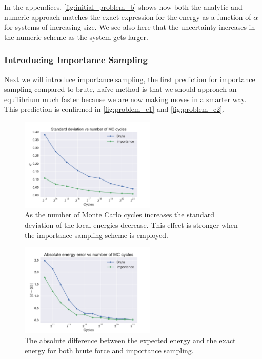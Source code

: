 \documentclass[
    a4paper, aps, twocolumn, floatfix, superscriptaddress,
    nofootinbib]{revtex4-1}
\newcommand{\1}{\mathds{1}}
\begin{document}
        In the appendices,  \autoref{fig:initial_problem_b} shows how both the
        analytic and numeric approach matches the exact expression for the
        energy as a function of $\alpha$ for systems of increasing size.  We see
        also here that the uncertainty increases in the numeric scheme as the
        system gets larger.

        \subsubsection{Introducing Importance Sampling}

            Next we will introduce importance sampling, the first prediction for
            importance sampling compared to brute, naïve method is that we
            should approach an equilibrium much faster because we are now making
            moves in a smarter way. This prediction is confirmed in
            \autoref{fig:problem_c1} and \autoref{fig:problem_c2}.

            \begin{figure}
                \centering
                    \includegraphics[width=244px]
                    {../data/figures/problem_c1.pdf}
                    \caption{As the number of Monte Carlo cycles increases the
                    standard deviation of the local energies decrease. This
                    effect is stronger when the importance sampling scheme is
                    employed.}
                    \label{fig:problem_c1}
            \end{figure}

            \begin{figure}
                \centering
                    \includegraphics[width=244px]
                    {../data/figures/problem_c2.pdf}
                    \caption{The absolute difference between the expected energy
                    and the exact energy for both brute force and importance
                    sampling. }
                    \label{fig:problem_c2}
            \end{figure}
\end{document}
